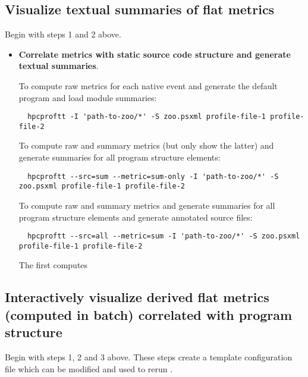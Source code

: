 \documentclass[english]{article}
\begin{document}
\subsection{Visualize textual summaries of flat metrics}

Begin with steps 1 and 2 above.

\begin{itemize}

\item \textbf{Correlate metrics with static source code structure and generate textual summaries}.

To compute raw metrics for each native event and generate the default program and load module summaries:
\begin{verbatim}
  hpcproftt -I 'path-to-zoo/*' -S zoo.psxml profile-file-1 profile-file-2
\end{verbatim}

To compute raw and summary metrics (but only show the latter) and generate summaries for all program structure elements:
\begin{verbatim}
  hpcproftt --src=sum --metric=sum-only -I 'path-to-zoo/*' -S zoo.psxml profile-file-1 profile-file-2
\end{verbatim}

To compute raw and summary metrics and generate summaries for all program structure elements and generate annotated source files:
\begin{verbatim}
  hpcproftt --src=all --metric=sum -I 'path-to-zoo/*' -S zoo.psxml profile-file-1 profile-file-2
\end{verbatim}


The first computes

\end{itemize}


\subsection{Interactively visualize derived flat metrics (computed in batch) correlated with program structure}

Begin with steps 1, 2 and 3 above.
These steps create a template  configuration file which can be modified and used to rerun .
\end{document}
